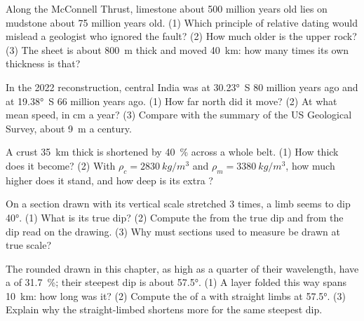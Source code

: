 \begin{exercise}[$\star\star$]\label{exo:g12:mountain-building:8}
Along the McConnell Thrust, limestone about 500 million years old lies on
mudstone about 75 million years old. (1) Which principle of relative dating
would mislead a geologist who ignored the fault? (2) How much older is the
upper rock? (3) The  sheet is about \qty{800}{m} thick and moved
\qty{40}{km}: how many times its own thickness is that?
\end{exercise}

\begin{exercise}[$\star\star$]\label{exo:g12:mountain-building:9}
In the 2022 reconstruction, central India was at \ang{30.23}~S 80 million
years ago and at \ang{19.38}~S 66 million years ago. (1) How far north did it
move? (2) At what mean speed, in \unit{cm} a year? (3) Compare with the
summary of the US Geological Survey, about \qty{9}{m} a century.
\end{exercise}

\begin{exercise}[$\star\star$]\label{exo:g12:mountain-building:10}
A crust \qty{35}{km} thick is shortened by \qty{40}{\percent} across a
whole belt. (1) How thick does it become? (2) With $\rho_c =
\qty{2830}{kg/m^3}$ and $\rho_m = \qty{3380}{kg/m^3}$, how much higher does it
stand, and how deep is its extra ?
\end{exercise}

\begin{exercise}[$\star\star$]\label{exo:g12:mountain-building:11}
On a section drawn with its vertical scale stretched 3 times, a limb seems
to dip \ang{40}. (1) What is its true dip? (2) Compute the  from the
true dip and from the dip read on the drawing. (3) Why must sections used to
measure  be drawn at true scale?
\end{exercise}

\begin{exercise}[$\star\star\star$]\label{exo:g12:mountain-building:12}
The rounded  drawn in this chapter, as high as a quarter of their
wavelength, have a  of \qty{31.7}{\percent}; their steepest dip is
about \ang{57.5}. (1) A layer folded this way spans \qty{10}{km}: how long
was it? (2) Compute the  of a  with straight limbs at
\ang{57.5}. (3) Explain why the straight-limbed  shortens more for the
same steepest dip.
\end{exercise}

